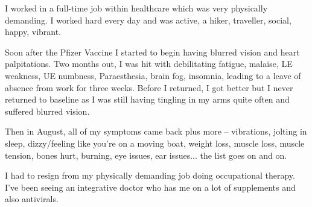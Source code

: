 I worked in a full-time job within healthcare which was very physically
demanding. I worked hard every day and was active, a hiker, traveller, social,
happy, vibrant.

Soon after the Pfizer Vaccine I started to begin having blurred vision and heart
palpitations. Two months out, I was hit with debilitating fatigue, malaise, LE
weakness, UE numbness, Paraesthesia, brain fog, insomnia, leading to a leave of
absence from work for three weeks. Before I returned, I got better but I never
returned to baseline as I was still having tingling in my arms quite often and
suffered blurred vision.

Then in August, all of my symptoms came back plus more – vibrations, jolting in
sleep, dizzy/feeling like you’re on a moving boat, weight loss, muscle loss,
muscle tension, bones hurt, burning, eye issues, ear issues... the list goes on
and on.

I had to resign from my physically demanding job doing occupational
therapy. I’ve been seeing an integrative doctor who has me on a lot of
supplements and also antivirals.
